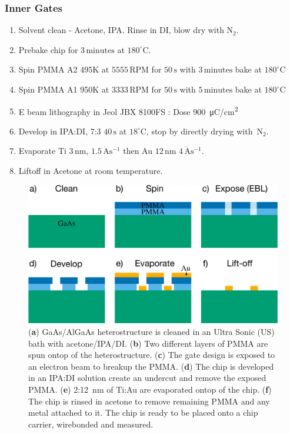 \subsubsection{Inner Gates}

\begin{enumerate}
\item Solvent clean - Acetone, IPA. Rinse in DI, blow dry with $\mathrm{N_2}$.
\item Prebake chip for $3\,\mathrm{minutes}$ at $180^\circ$C.
\item Spin PMMA A2 495K at $5555\,\mathrm{RPM}$ for $50\,\mathrm{s}$ with $3\,\mathrm{minutes}$ bake at $180^\circ$C
\item Spin PMMA A1 950K at $3333\,\mathrm{RPM}$ for $50\,\mathrm{s}$ with $5\,\mathrm{minutes}$ bake at $180^\circ$C
\item E beam lithography in Jeol JBX 8100FS : Dose \qty{900}{\micro C/cm^2}
\item Develop in IPA:DI, 7:3 $40\,\mathrm{s}$ at $18^\circ$C, stop by directly drying with $\,\mathrm{N_2}$.
\item Evaporate Ti $3\,\mathrm{nm}$, $1.5\,\mathrm{\dot{A}s^{-1}}$ then Au $12\,\mathrm{nm}$ $4\,\mathrm{\dot{A}s^{-1}}$.
\item Liftoff in Acetone at room temperature.
\end{enumerate}



\begin{figure}[!bht]
 \begin{center}
 \includegraphics[width=1.0\textwidth]{figures/appendix/figure20.pdf}
 \caption[Gate Fabrication Illustration]{\label{fig:appx/gate_fab} 
 (\textbf{a}) GaAs/AlGaAs heterostructure is cleaned in an Ultra Sonic (US) bath with acetone/IPA/DI. 
 (\textbf{b}) Two different layers of PMMA are spun ontop of the heterostructure.
 (\textbf{c}) The gate design is exposed to an electron beam to breakup the PMMA.
 (\textbf{d}) The chip is developed in an IPA:DI solution create an undercut and remove the exposed PMMA.
 (\textbf{e}) 2:\qty{12}{nm} of Ti:Au are evaporated ontop of the chip.
 (\textbf{f}) The chip is rinsed in acetone to remove remaining PMMA and any metal attached to it. The chip is ready to be placed onto a chip carrier, wirebonded and measured.}
 \end{center}
\end{figure}



